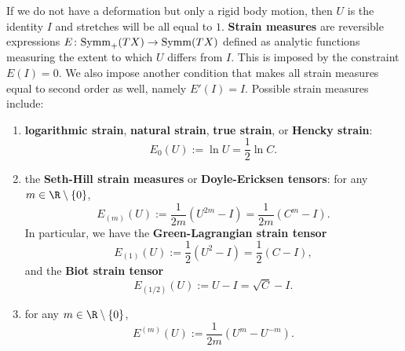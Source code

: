 \begin{discussion}
  If we do not have a deformation but only a rigid body motion, then
  $U$ is the identity $I$ and stretches will be all equal to $1$.
  \textbf{Strain measures} are reversible expressions
  $E \colon {\rm Symm}_+(T X) \to {\rm Symm}(T X)$
  defined as analytic functions measuring the extent to which $U$
  differs from $I$.
  This is imposed by the constraint $E(I) = 0$.
  We also impose another condition that makes all strain measures equal to
  second order as well, namely $E'(I) = I$.
  Possible strain measures include:
  \begin{enumerate}
    \item
      \textbf{logarithmic strain}, \textbf{natural strain},
      \textbf{true strain}, or \textbf{Hencky strain}:
      \begin{equation}
        E_{0}(U) := \ln U = \frac{1}{2} \ln{C}.
      \end{equation}
    \item
      the \textbf{Seth-Hill strain measures} or \textbf{Doyle-Ericksen tensors}:
      for any $m \in \R \setminus \{0\}$,
      \begin{equation}
        E_{(m)}(U) := \frac{1}{2 m}(U^{2 m} - I) = \frac{1}{2 m}(C^m - I).
      \end{equation}
      In particular, we have the \textbf{Green-Lagrangian strain tensor}
      \begin{equation}
        E_{(1)}(U) := \frac{1}{2}(U^2 - I) = \frac{1}{2}(C- I),
      \end{equation}
      and the \textbf{Biot strain tensor}
      \begin{equation}
        E_{(1 / 2)}(U) := U - I = \sqrt{C} - I.
      \end{equation}
    \item
      for any $m \in \R \setminus \{0\}$,
      \begin{equation}
        E^{(m)}(U) := \frac{1}{2 m}(U^m - U^{-m}).
      \end{equation}
  \end{enumerate}
\end{discussion}
